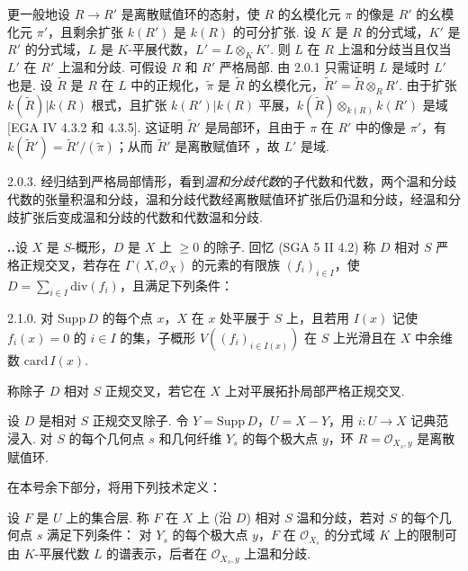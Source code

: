 更一般地设 $R \to R'$ 是离散赋值环的态射，使 $R$ 的幺模化元 $\pi$ 的像是 $R'$ 的幺模化元 $\pi'$，且剩余扩张 $k(R')$ 是 $k(R)$ 的可分扩张. 设 $K$ 是 $R$ 的分式域，$K'$ 是 $R'$ 的分式域，$L$ 是 $K$-平展代数，$L' = L \otimes_K K'$. 则 $L$ 在 $R$ 上温和分歧当且仅当 $L'$ 在 $R'$ 上温和分歧. 可假设 $R$ 和 $R'$ 严格局部. 由 2.0.1 只需证明 $L$ 是域时 $L'$ 也是. 设 $\widetilde{R}$ 是 $R$ 在 $L$ 中的正规化，$\widetilde{\pi}$ 是 $\widetilde{R}$ 的幺模化元，$\widetilde{R}' = \widetilde{R} \otimes_R R'$. 由于扩张 $k(\widetilde{R})|k(R)$ 根式，且扩张 $k(R')|k(R)$ 平展，$k(\widetilde{R}) \otimes_{k(R)} k(R')$ 是域 [EGA IV 4.3.2 和 4.3.5]. 这证明 $\widetilde{R}'$ 是局部环，且由于 $\pi$ 在 $R'$ 中的像是 $\pi'$，有 $k(\widetilde{R}') = \widetilde{R}'/(\widetilde{\pi})$；从而 $\widetilde{R}'$ 是离散赋值环 \cite[第一章 §2 命题 2]{exp13-5}，故 $L'$ 是域.

2.0.3. 经归结到严格局部情形，看到\emph{温和分歧代数}的子代数和代数，两个温和分歧代数的张量积温和分歧，温和分歧代数经离散赋值环扩张后仍温和分歧，经温和分歧扩张后变成温和分歧的代数和代数温和分歧.

\noindent\textbf{\thesection..}\quad 设 $X$ 是 $S$-概形，$D$ 是 $X$ 上 $\geqslant 0$ 的除子. 回忆 (SGA 5 II 4.2) 称 $D$ 相对 $S$ 严格正规交叉，若存在 $\Gamma(X, \mathcal{O}_X)$ 的元素的有限族 $(f_i)_{i \in I}$，使 $D = \sum_{i \in I} \mathrm{div}(f_i)$，且满足下列条件：

2.1.0. 对 $\mathrm{Supp}\, D$ 的每个点 $x$，$X$ 在 $x$ 处平展于 $S$ 上，且若用 $I(x)$ 记使 $f_i(x) = 0$ 的 $i \in I$ 的集，子概形 $V((f_i)_{i \in I(x)})$ 在 $S$ 上光滑且在 $X$ 中余维数 $\mathrm{card}\, I(x)$.

称除子 $D$ 相对 $S$ 正规交叉，若它在 $X$ 上对平展拓扑局部严格正规交叉.

设 $D$ 是相对 $S$ 正规交叉除子. 令 $Y = \mathrm{Supp}\, D$，$U = X - Y$，用 $i \colon U \to X$ 记典范浸入. 对 $S$ 的每个几何点 $s$ 和几何纤维 $Y_s$ 的每个极大点 $y$，环 $R = \mathcal{O}_{X_s, y}$ 是离散赋值环.

在本号余下部分，将用下列技术定义：

\begingroup
\addtocounter{theorem}{-1}
\renewcommand{\thetheorem}{\thesection.1.1}
\begin{definition}\label{def:XIII.2.1.1}
设 $F$ 是 $U$ 上的集合层. 称 $F$ 在 $X$ 上 (沿 $D$) 相对 $S$ 温和分歧，若对 $S$ 的每个几何点 $s$ 满足下列条件：
对 $Y_s$ 的每个极大点 $y$，$F$ 在 $\mathcal{O}_{X_s}$ 的分式域 $K$ 上的限制可由 $K$-平展代数 $L$ 的谱表示，后者在 $\mathcal{O}_{X_s, y}$ 上温和分歧.
\end{definition}
\endgroup

